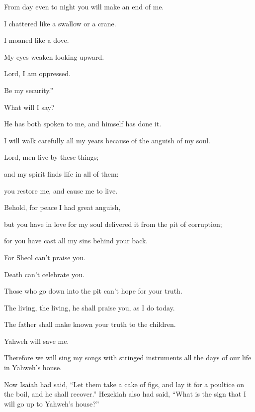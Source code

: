 {\par }{\QB From day even to night you will make an end of me.
\par }{\Q {}I chattered like a swallow or a crane.
\par }{\QB I moaned like a dove.
\par }{\QB My eyes weaken looking upward.
\par }{\QB Lord, I am oppressed.
\par }{\QB Be my security.”
\par }{\Q {}What will I say?
\par }{\QB He has both spoken to me, and himself has done it.
\par }{\QB I will walk carefully all my years because of the anguish of my soul.
\par }{\Q {}Lord, men live by these things;
\par }{\QB and my spirit finds life in all of them:
\par }{\QB you restore me, and cause me to live.
\par }{\Q {}Behold, for peace I had great anguish,
\par }{\QB but you have in love for my soul delivered it from the pit of corruption;
\par }{\QB for you have cast all my sins behind your back.
\par }{\Q {}For Sheol can’t praise you.
\par }{\QB Death can’t celebrate you.
\par }{\Q Those who go down into the pit can’t hope for your truth.
\par }{\Q {}The living, the living, he shall praise you, as I do today.
\par }{\QB The father shall make known your truth to the children.
\par }{\Q {}Yahweh will save me.
\par }{\QB Therefore we will sing my songs with stringed instruments all the days of our life in Yahweh’s house.
\par }{\PP {}Now Isaiah had said, “Let them take a cake of figs, and lay it for a poultice on the boil, and he shall recover.”
Hezekiah also had said, “What is the sign that I will go up to Yahweh’s house?”

}
